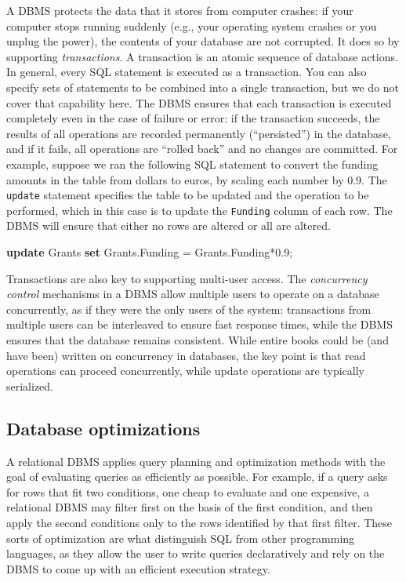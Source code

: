 \documentclass[]{krantz}
\newenvironment{Shaded}{\begin{snugshade}}{\end{snugshade}}
\newcommand{\KeywordTok}[1]{\textcolor[rgb]{0.13,0.29,0.53}{\textbf{#1}}}
\newcommand{\FloatTok}[1]{\textcolor[rgb]{0.00,0.00,0.81}{#1}}
\newcommand{\NormalTok}[1]{#1}
\begin{document}
A DBMS protects the data that it stores from computer crashes: if your
computer stops running suddenly (e.g., your operating system crashes or
you unplug the power), the contents of your database are not corrupted.
It does so by supporting \emph{transactions}. A transaction is an atomic
sequence of database actions. In general, every SQL statement is
executed as a transaction. You can also specify sets of statements to be
combined into a single transaction, but we do not cover that capability
here. The DBMS ensures that each transaction is executed completely even
in the case of failure or error: if the transaction succeeds, the
results of all operations are recorded permanently (``persisted'') in
the database, and if it fails, all operations are ``rolled back'' and no
changes are committed. For example, suppose we ran the following SQL
statement to convert the funding amounts in the table from dollars to
euros, by scaling each number by 0.9. The \texttt{update} statement
specifies the table to be updated and the operation to be performed,
which in this case is to update the \texttt{Funding} column of each row.
The DBMS will ensure that either no rows are altered or all are altered.

\begin{Shaded}
\begin{Highlighting}[]
\KeywordTok{update}\NormalTok{ Grants }\KeywordTok{set}\NormalTok{ Grants.Funding = Grants.Funding*}\FloatTok{0.9}\NormalTok{;}
\end{Highlighting}
\end{Shaded}

Transactions are also key to supporting multi-user access. The
\emph{concurrency control} mechanisms in a DBMS allow multiple users to
operate on a database concurrently, as if they were the only users of
the system: transactions from multiple users can be interleaved to
ensure fast response times, while the DBMS ensures that the database
remains consistent. While entire books could be (and have been) written
on concurrency in databases, the key point is that read operations can
proceed concurrently, while update operations are typically serialized.

\hypertarget{sec:db:index}{\subsection{Database
optimizations}\label{sec:db:index}}

A relational DBMS applies query planning and optimization methods with
the goal of evaluating queries as efficiently as possible. For example,
if a query asks for rows that fit two conditions, one cheap to evaluate
and one expensive, a relational DBMS may filter first on the basis of
the first condition, and then apply the second conditions only to the
rows identified by that first filter. These sorts of optimization are
what distinguish SQL from other programming languages, as they allow the
user to write queries declaratively and rely on the DBMS to come up with
an efficient execution strategy.
\end{document}

